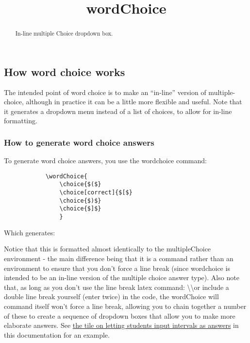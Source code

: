 \documentclass{ximera}
\title{wordChoice}
\begin{document}
\begin{abstract}
    In-line multiple Choice dropdown box.
\end{abstract}
\maketitle

\subsection*{How word choice works}
    
    The intended point of word choice is to make an ``in-line'' version of multiple-choice, although in practice it can be a little more flexible and useful. Note that it generates a dropdown menu instead of a list of choices, to allow for in-line formatting.

    \subsubsection*{How to generate word choice answers}
        To generate word choice answers, you use the wordchoice command:
        \begin{verbatim} 
            \wordChoice{
                \choice{$($}
                \choice[correct]{$[$}
                \choice{$)$}
                \choice{$]$}
                }
        \end{verbatim}
        
        Which generates: 
        \wordChoice{
            \choice{$($}
            \choice[correct]{$[$}
            \choice{$)$}
            \choice{$]$}
            }
        
        Notice that this is formatted almost identically to the multipleChoice environment - the main difference being that it is a command rather than an environment to ensure that you don't force a line break (since wordchoice is intended to be an in-line version of the multiple choice answer type). Also note that, as long as you don't use the line break latex command: \textbackslash\textbackslash or include a double line break yourself (enter twice) in the code, the wordChoice will command itself won't force a line break, allowing you to chain together a number of these to create a sequence of dropdown boxes that allow you to make more elaborate answers. See \href{https://xronos.clas.ufl.edu/examples/exampleCore/problemDesign/intervals}{the tile on letting students input intervals as answers} in this documentation for an example.
        
\end{document}
